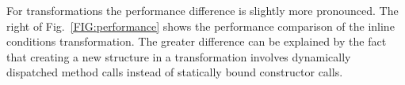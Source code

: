 For transformations the performance difference is slightly more pronounced.
The right of Fig.~\ref{FIG:performance} shows the performance comparison of the inline conditions transformation. 
The greater difference can be explained by the fact that creating a new structure in a \name transformation involves dynamically dispatched method calls instead of statically bound constructor calls. 




